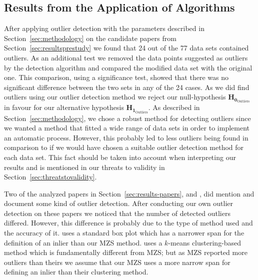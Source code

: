 \subsection{Results from the Application of Algorithms}
\label{sec:discussion-resultsapplication}
After applying outlier detection with the parameters described in Section~\ref{sec:methodology} on the candidate papers from Section~\ref{sec:resultsprestudy} we found that 24 out of the 77 data sets contained outliers. As an additional test we removed the data points suggested as outliers by the detection algorithm and compared the modified data set with the original one. This comparison, using a significance test, showed that there was no significant difference between the two sets in any of the 24 cases. As we did find outliers using our outlier detection method we reject our null-hypothesis $\mathbf{H_{0_{\mathrm{Outliers}}}}$ in favour for our alternative hypothesis $\mathbf{H_{1_{\mathrm{Outliers}}}}$. As described in Section~\ref{sec:methodology}, we chose a robust method for detecting outliers since we wanted a method that fitted a wide range of data sets in order to implement an automatic process. However, this probably led to less outliers being found in comparison to if we would have chosen a suitable outlier detection method for each data set. This fact should be taken into account when interpreting our results and is mentioned in our threats to validity in Section~\ref{sec:threatstovalidity}.




Two of the analyzed papers in Section~\ref{sec:results-papers}, \citep{itkonen2013test} and \citep{minku2013analysis}, did mention and document some kind of outlier detection. After conducting our own outlier detection on these papers we noticed that the number of detected outliers differed. However, this difference is probably due to the type of method used and the accuracy of it. \citet{itkonen2013test} uses a standard box plot which has a narrower span for the definition of an inlier than our MZS method. \citet{minku2013analysis} uses a $k$-means clustering-based method which is fundamentally different from MZS; but as MZS reported more outliers than theirs we assume that our MZS uses a more narrow span for defining an inlier than their clustering method.




